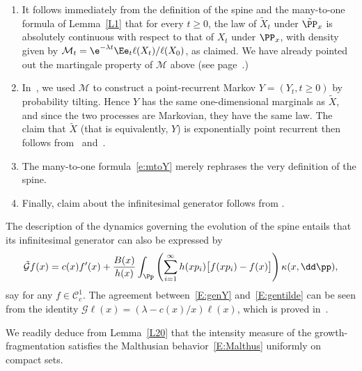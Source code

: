 \begin{proofc}
\begin{enumerate}
\item \label{listproof4.4.1}It follows immediately from the definition of the spine and the many-to-one formula of Lemma~\ref{L1} that for every $t\geq 0$, the law of $\tilde X_t$ under $\tilde \PP_x$ is absolutely continuous with respect to that of $X_t$ under $\PP_x$, with density given by $\mathcal{M}_t = \e^{-\lambda t} \Ee_t \ell(X_t)/\ell(X_0)$, as claimed. We have already pointed out the martingale property of $\mathcal{M}$ above (see page~\pageref{s:mart}.)

\item \label{listproof4.4.2}In~\cite[Section~5]{BW}, we used $\mathcal{M}$ to construct a point-recurrent Markov $Y=(Y_t, t\geq 0)$ by probability tilting. Hence $Y$ has the same one-dimensional marginals as $\tilde X$, and since the two processes are Markovian, they have the same law. The claim that $\tilde X$ (that is equivalently, $Y$) is exponentially point recurrent then follows from~\cite[Proof of Theorem~2]{BeFK} and~\cite[Lemma~5.2$\MK$(iii)]{BW}.

\item \label{listproof4.4.3}The many-to-one formula~\eqref{e:mtoY} merely rephrases the very definition of the spine.

\item \label{listproof4.4.4}Finally, claim about the infinitesimal generator follows from \cite[Lem\-ma~5.1]{BW}.
\end{enumerate}
\end{proofc}

\begin{rema}
The description of the dynamics governing the evolution of the spine entails that its infinitesimal generator can also be expressed by
\begin{equation}\label{E:gentilde}
\tilde {\mathcal G}f(x) = c(x) f'(x) + \frac{B(x)}{h(x)} \int_{\Pp} \left(\sum_{i=1}^{\infty}h(xp_i)\bigl[f(xp_i)-f(x)\bigr]\right) \kappa(x, \dd \pp),
\end{equation}
say for any $f\in{\mathcal C}^1_c$. The agreement between~\eqref{E:genY} and~\eqref{E:gentilde} can be seen from the identity $\mathcal{G}\ell(x) = (\lambda - c(x)/x)\ell(x)$, which is proved in~\cite[Corollary~4.5$\MK$(i)]{BW}.
\end{rema}

We readily deduce from Lemma~\ref{L20} that the intensity measure of the growth-fragmentation satisfies the Malthusian behavior~\eqref{E:Malthus} uniformly on compact sets.

